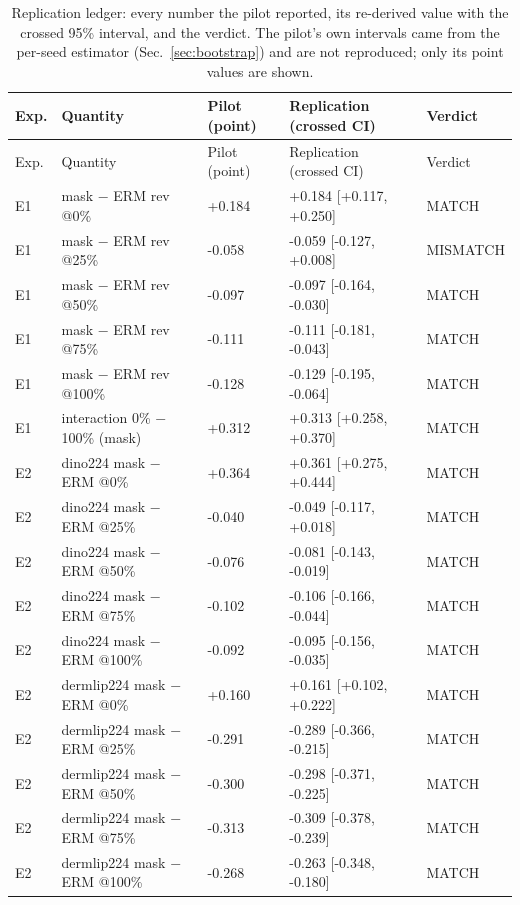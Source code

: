 {\scriptsize
\begin{longtable}{llp{1.7cm}p{3.3cm}l}
\caption{Replication ledger: every number the pilot reported, its re-derived value with the crossed 95\% interval, and the verdict. The pilot's own intervals came from the per-seed estimator (Sec.~\ref{sec:bootstrap}) and are not reproduced; only its point values are shown.}\label{tab:ledger}\\\toprule
Exp. & Quantity & Pilot (point) & Replication (crossed CI) & Verdict \\\midrule
\endfirsthead
\toprule Exp. & Quantity & Pilot (point) & Replication (crossed CI) & Verdict \\\midrule
\endhead
\bottomrule
\endlastfoot
E1 & mask $-$ ERM rev @0\% & +0.184 & +0.184 [+0.117, +0.250] & MATCH \\
E1 & mask $-$ ERM rev @25\% & -0.058 & -0.059 [-0.127, +0.008] & MISMATCH \\
E1 & mask $-$ ERM rev @50\% & -0.097 & -0.097 [-0.164, -0.030] & MATCH \\
E1 & mask $-$ ERM rev @75\% & -0.111 & -0.111 [-0.181, -0.043] & MATCH \\
E1 & mask $-$ ERM rev @100\% & -0.128 & -0.129 [-0.195, -0.064] & MATCH \\
E1 & interaction 0\% $-$ 100\% (mask) & +0.312 & +0.313 [+0.258, +0.370] & MATCH \\
E2 & dino224 mask $-$ ERM @0\% & +0.364 & +0.361 [+0.275, +0.444] & MATCH \\
E2 & dino224 mask $-$ ERM @25\% & -0.040 & -0.049 [-0.117, +0.018] & MATCH \\
E2 & dino224 mask $-$ ERM @50\% & -0.076 & -0.081 [-0.143, -0.019] & MATCH \\
E2 & dino224 mask $-$ ERM @75\% & -0.102 & -0.106 [-0.166, -0.044] & MATCH \\
E2 & dino224 mask $-$ ERM @100\% & -0.092 & -0.095 [-0.156, -0.035] & MATCH \\
E2 & dermlip224 mask $-$ ERM @0\% & +0.160 & +0.161 [+0.102, +0.222] & MATCH \\
E2 & dermlip224 mask $-$ ERM @25\% & -0.291 & -0.289 [-0.366, -0.215] & MATCH \\
E2 & dermlip224 mask $-$ ERM @50\% & -0.300 & -0.298 [-0.371, -0.225] & MATCH \\
E2 & dermlip224 mask $-$ ERM @75\% & -0.313 & -0.309 [-0.378, -0.239] & MATCH \\
E2 & dermlip224 mask $-$ ERM @100\% & -0.268 & -0.263 [-0.348, -0.180] & MATCH \\

\end{longtable}}
